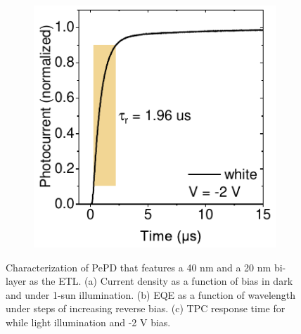 \begin{figure}[htbp]
\begin{subfigure}{0.32\textwidth}
        \caption{}
        \label{}
    \end{subfigure}
    \hfill
    \begin{subfigure}{0.3\textwidth}
        \centering
        \includegraphics[width=\textwidth]{chapters/transport_layers/images/40C60-20TiO2-rise.pdf}
        \caption{}
    \end{subfigure}
    
    \caption{Characterization of PePD that features a 40 nm  and a 20 nm  bi-layer as the ETL. (a) Current density as a function of bias in dark and under 1-sun illumination. (b) EQE as a function of wavelength under steps of increasing reverse bias. (c) TPC response time for while light illumination and -2 V bias.}
    \label{fig:etl_opt:40C60_20TiO2}
\end{figure}



